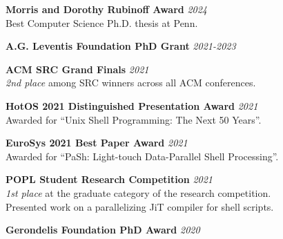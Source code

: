 \documentclass[margin]{res}
\begin{document}
\begin{resume}
\textbf{Morris and Dorothy Rubinoff Award} \hfill {\em 2024} \\
Best Computer Science Ph.D. thesis at Penn.

\textbf{A.G. Leventis Foundation PhD Grant} \hfill {\em 2021-2023}

\textbf{ACM SRC Grand Finals} \hfill {\em 2021} \\
\textit{2nd place} among SRC winners across all ACM conferences.

\textbf{HotOS 2021 Distinguished Presentation Award} \hfill {\em 2021} \\
Awarded for ``Unix Shell Programming: The Next 50 Years''.

\textbf{EuroSys 2021 Best Paper Award} \hfill {\em 2021} \\
Awarded for ``PaSh: Light-touch Data-Parallel Shell Processing''.

\textbf{POPL Student Research Competition} \hfill {\em 2021} \\
\textit{1st place} at the graduate category of the research competition. \\
Presented work on a parallelizing JiT compiler for shell scripts. 

\textbf{Gerondelis Foundation PhD Award} \hfill {\em 2020}






\end{resume}
\end{document}
